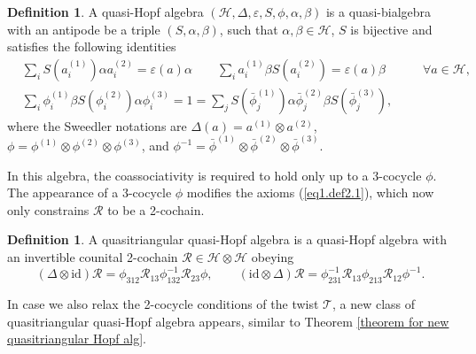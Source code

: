\documentclass[reqno]{amsart}
\theoremstyle{definition}
\newtheorem{definition}[formula]{Definition}
\theoremstyle{remark}
\begin{document}
\begin{definition}
    A quasi-Hopf algebra $(\mathscr{H}, \Delta, \varepsilon, S, \phi, \alpha, \beta)$ is a quasi-bialgebra with an antipode be a triple $(S,\alpha,\beta)$, such that $\alpha,\beta \in \mathscr{H}$, $S$ is bijective and satisfies the following identities
    \begin{equation}
        \begin{split}
            &\sum\limits_i {S\left( {{a^{(1)}_i}} \right)\alpha {a^{(2)}_i}}  = \varepsilon \left( a \right)\alpha \qquad \sum\limits_i {{a^{(1)}_i}\beta S\left( {{a^{(2)}_i}} \right)}  = \varepsilon \left( a \right)\beta \qquad\quad \forall a \in \mathscr{H},\\
        &\sum\limits_i {{\phi^{{(1)}}_i}\beta S\left( {{\phi^{{(2)}}_i}} \right)\alpha {\phi^{{(3)}}_i}}  = 1 = \sum\limits_j {S\left( {{\bar{\phi}^{{(1)}}_j}} \right)\alpha {\bar{\phi}^{{(2)}}_j}\beta S\left( {{\bar{\phi}^{{(3)}}_j}} \right)},
        \end{split}
    \end{equation}
    where the Sweedler notations are $\Delta(a)=a^{(1)} \otimes a^{(2)}$, $\phi  = {{\phi^{(1)}} \otimes {\phi^{(2)}} \otimes {\phi^{(3)}}} $, and ${\phi ^{ - 1}} =  {{\bar{\phi}^{{(1)}}} \otimes {\bar{\phi}^{{(2)}}} \otimes {\bar{\phi}^{{(3)}}}} $.
\end{definition}
In this algebra, the coassociativity is
required to hold only up to a 3-cocycle $\phi$. The appearance of a 3-cocycle $\phi$ modifies the axioms (\ref{eq1.def2.1}), which now only constrains $\mathcal{R}$ to be a 2-cochain. 
\begin{definition}\label{def:quasitriangular quasi-Hopf}
    A quasitriangular quasi-Hopf algebra is a quasi-Hopf algebra with an invertible counital 2-cochain $\mathcal{R} \in \mathscr{H}\otimes \mathscr{H} $ obeying
    \begin{equation}
        (\Delta \otimes \textrm{id})\mathcal{R} = \phi_{312} \mathcal{R}_{13}\phi_{132}^{-1}\mathcal{R}_{23}\phi, \qquad (\textrm{id}\otimes \Delta )\mathcal{R}=\phi_{231}^{-1}\mathcal{R}_{13}\phi_{213}\mathcal{R}_{12}\phi^{-1}.
    \end{equation}
\end{definition}
In case we also relax the 2-cocycle conditions of the twist $\mathcal{T}$, a new class of quasitriangular quasi-Hopf algebra appears, similar to Theorem \ref{theorem for new quasitriangular Hopf alg}.
\end{document}
